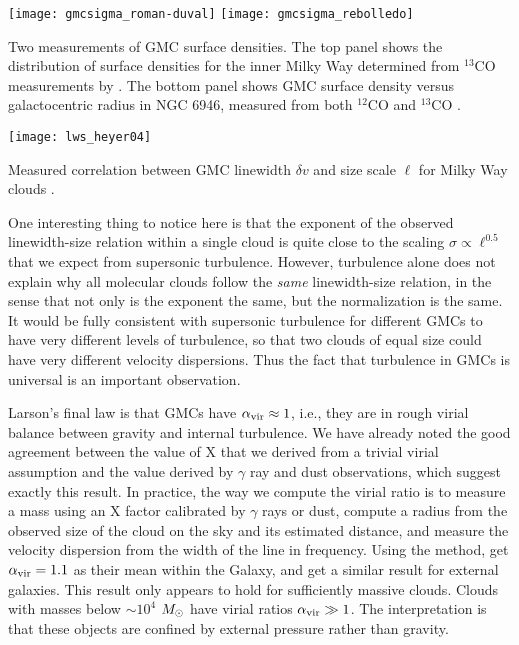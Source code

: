 \begin{marginfigure}
\texttt{[image: gmcsigma\_roman-duval]}
\texttt{[image: gmcsigma\_rebolledo]}
\caption[GMC surface densities]{
\label{fig:gmcsigma}
Two measurements of GMC surface densities. The top panel shows the distribution of surface densities for the inner Milky Way determined from $^{13}$CO measurements by \citet{roman-duval10a}. The bottom panel shows GMC surface density versus galactocentric radius in NGC 6946, measured from both $^{12}$CO and $^{13}$CO \citep{rebolledo12a}.
}
\end{marginfigure}

\begin{marginfigure}
\texttt{[image: lws\_heyer04]}
\caption[GMC linewidth-size relation]{
\label{fig:gmclws}
Measured correlation between GMC linewidth $\delta v$ and size scale $\ell$ for Milky Way clouds \citep{heyer04a}.
}
\end{marginfigure}

One interesting thing to notice here is that the exponent of the observed linewidth-size relation within a single cloud is quite close to the scaling $\sigma\propto \ell^{0.5}$ that we expect from supersonic turbulence. However, turbulence alone does not explain why all molecular clouds follow the {\it same} linewidth-size relation, in the sense that not only is the exponent the same, but the normalization is the same. It would be fully consistent with supersonic turbulence for different GMCs to have very different levels of turbulence, so that two clouds of equal size could have very different velocity dispersions. Thus the fact that turbulence in GMCs is universal is an important observation.

Larson's final law is that GMCs have $\alpha_{\mathrm{vir}}\approx 1$, i.e., they are in rough virial balance between gravity and internal turbulence. We have already noted the good agreement between the value of X that we derived from a trivial virial assumption and the value derived by $\gamma$ ray and dust observations, which suggest exactly this result. In practice, the way we compute the virial ratio is to measure a mass using an X factor calibrated by $\gamma$ rays or dust, compute a radius from the observed size of the cloud on the sky and its estimated distance, and measure the velocity dispersion from the width of the line in frequency. Using the method, \citet{solomon97a} get $\alpha_{\mathrm{vir}}=1.1$ as their mean within the Galaxy, and \citet{bolatto08a} get a similar result for external galaxies. This result only appears to hold for sufficiently massive clouds. Clouds with masses below $\sim 10^4$ $M_{\odot}$ have virial ratios $\alpha_{\mathrm{vir}} \gg 1$. The interpretation is that these objects are confined by external pressure rather than gravity.

